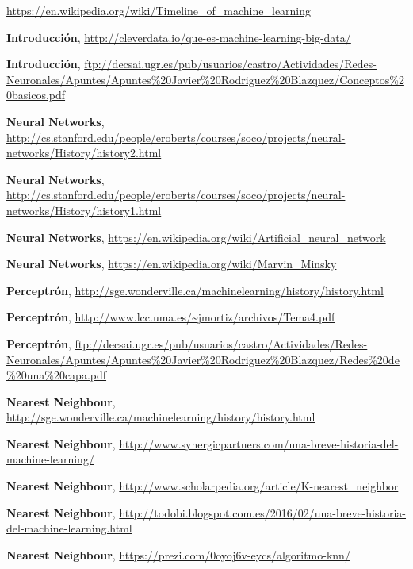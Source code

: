\documentclass[a4paper, 11pt]{article} %
\begin{document}
\begin{thebibliography}{9}

 \url{https://en.wikipedia.org/wiki/Timeline_of_machine_learning}

 	\textbf{Introducción},
 \url{http://cleverdata.io/que-es-machine-learning-big-data/}
 
 	\textbf{Introducción},
 \url{ftp://decsai.ugr.es/pub/usuarios/castro/Actividades/Redes-Neuronales/Apuntes/Apuntes%20Javier%20Rodriguez%20Blazquez/Conceptos%20basicos.pdf}

	\textbf{Neural Networks},
  \url{http://cs.stanford.edu/people/eroberts/courses/soco/projects/neural-networks/History/history2.html}
 
 	\textbf{Neural Networks},
 \url{http://cs.stanford.edu/people/eroberts/courses/soco/projects/neural-networks/History/history1.html}
 
 	\textbf{Neural Networks},
 \url{https://en.wikipedia.org/wiki/Artificial_neural_network}
 
 	\textbf{Neural Networks},
 \url{https://en.wikipedia.org/wiki/Marvin_Minsky}
 
 	\textbf{Perceptrón},
 \url{http://sge.wonderville.ca/machinelearning/history/history.html}
 
 	\textbf{Perceptrón},
 \url{http://www.lcc.uma.es/~jmortiz/archivos/Tema4.pdf}
 
 	\textbf{Perceptrón},
 \url{ftp://decsai.ugr.es/pub/usuarios/castro/Actividades/Redes-Neuronales/Apuntes/Apuntes%20Javier%20Rodriguez%20Blazquez/Redes%20de%20una%20capa.pdf}
 
 	\textbf{Nearest Neighbour},
 \url{http://sge.wonderville.ca/machinelearning/history/history.html}
 
 	\textbf{Nearest Neighbour},
 \url{http://www.synergicpartners.com/una-breve-historia-del-machine-learning/}
 
 	\textbf{Nearest Neighbour},
 \url{http://www.scholarpedia.org/article/K-nearest_neighbor}
 
 	\textbf{Nearest Neighbour},
 \url{http://todobi.blogspot.com.es/2016/02/una-breve-historia-del-machine-learning.html}
 
 	\textbf{Nearest Neighbour},
 \url{https://prezi.com/0oyoj6v-eycs/algoritmo-knn/}
 

\end{thebibliography}
\end{document}
